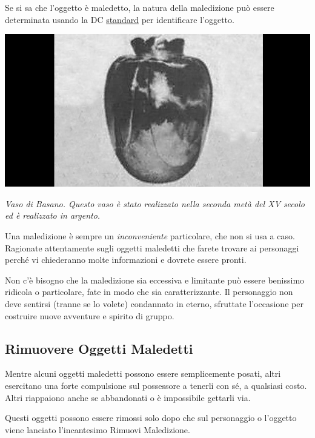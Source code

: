 \begin{multicols}{2}
	Se si sa che l'oggetto è maledetto, la natura della maledizione può essere determinata usando la DC \hyperlink{identificareom}{standard} per identificare l'oggetto.

	\begin{center}
		\includegraphics[width=0.75\linewidth]{immagini/vasobasano.png}

		\textit{Vaso di Basano. Questo vaso è stato realizzato nella seconda metà del XV secolo ed è realizzato in argento.}
	\end{center}


	\begin{changemargin}{0.3cm}{0.3cm}\begin{narratore}
			Una maledizione è sempre un \textit{inconveniente} particolare, che non si usa a caso. Ragionate attentamente sugli oggetti maledetti che farete trovare ai personaggi perché vi chiederanno molte informazioni e dovrete essere pronti.

			Non c'è bisogno che la maledizione sia eccessiva e limitante può essere benissimo ridicola o particolare, fate in modo che sia caratterizzante. Il personaggio non deve sentirsi (tranne se lo volete) condannato in eterno, sfruttate l'occasione per costruire nuove avventure e spirito di gruppo.
	\end{narratore}\end{changemargin}


	\subsection{Rimuovere Oggetti Maledetti}

	Mentre alcuni oggetti maledetti possono essere semplicemente posati, altri esercitano una forte compulsione sul possessore a tenerli con sé, a qualsiasi costo. Altri riappaiono anche se abbandonati o è impossibile gettarli via.

	Questi oggetti possono essere rimossi solo dopo che sul personaggio o l'oggetto viene lanciato l'incantesimo Rimuovi Maledizione.


\end{multicols}
